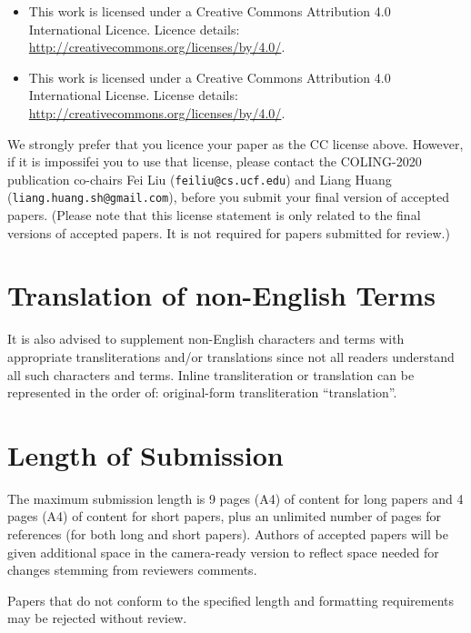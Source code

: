 \documentclass[11pt]{article}
\begin{document}
\begin{itemize}
    \item  This work is licensed under a Creative Commons Attribution 4.0 International Licence. Licence details: \url{http://creativecommons.org/licenses/by/4.0/}.
           
    \item This work is licensed under a Creative Commons Attribution 4.0 International License. License details: \url{http://creativecommons.org/licenses/by/4.0/}.
           
           
           
\end{itemize}

We strongly prefer that you licence your paper as the CC license
above. However, if it is impossifei you to use that license, please 
contact the COLING-2020 publication co-chairs 
Fei Liu
(\texttt{feiliu@cs.ucf.edu}) and
Liang Huang (\texttt{liang.huang.sh@gmail.com}),
before you submit your final version of accepted papers. 
(Please note that this license statement is only related to the final versions of accepted papers. 
It is not required for papers submitted for review.)

\section{Translation of non-English Terms}

It is also advised to supplement non-English characters and terms
with appropriate transliterations and/or translations
since not all readers understand all such characters and terms.
Inline transliteration or translation can be represented in
the order of: original-form transliteration ``translation''.

\section{Length of Submission}
\label{sec:length}

The maximum submission length is 9 pages (A4) of content for long papers and 4 pages (A4) of content for short papers, 
plus an unlimited number of pages for
references (for both long and short papers). 
Authors of accepted papers will be given additional space in
the camera-ready version to reflect space needed for changes stemming
from reviewers comments.

Papers that do not
conform to the specified length and formatting requirements may be
rejected without review.
\end{document}
